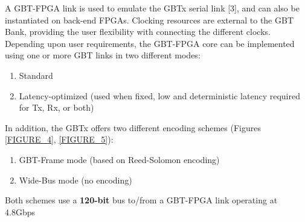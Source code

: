 A GBT-FPGA link is used to emulate the GBTx serial link [3], and can also be instantiated on back-end FPGAs. Clocking resources are external to the GBT Bank, providing the user flexibility with connecting the different clocks. Depending upon user requirements, the GBT-FPGA core can be implemented using one or more GBT links in two different modes:
\begin{enumerate}
\item Standard 
\item Latency-optimized (used when fixed, low and deterministic latency required for Tx, Rx, or both)
\end{enumerate}
In addition, the GBTx offers two different encoding schemes (Figures \ref{FIGURE_4}, \ref{FIGURE_5}):
\begin{enumerate}
\item GBT-Frame mode (based on Reed-Solomon encoding)
\item Wide-Bus mode (no encoding)
\end{enumerate}
Both schemes use a \textbf{120-bit} bus to/from a GBT-FPGA link operating at 4.8Gbps

